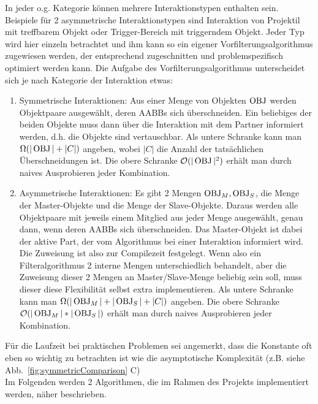 In jeder o.g. Kategorie können mehrere Interaktionstypen enthalten sein. Beispiele für 2 asymmetrische Interaktionstypen sind Interaktion von Projektil mit treffbarem Objekt oder Trigger-Bereich mit triggerndem Objekt. Jeder Typ wird hier einzeln betrachtet und ihm kann so ein eigener Vorfilterungsalgorithmus zugewiesen werden, der entsprechend zugeschnitten und problemspezifisch optimiert werden kann.
Die Aufgabe des Vorfilterungsalgorithmus unterscheidet sich je nach Kategorie der Interaktion etwas:
\begin{enumerate}
\item Symmetrische Interaktionen: Aus einer Menge von Objekten $\operatorname{OBJ}$ werden Objektpaare ausgewählt, deren AABBs sich überschneiden. Ein beliebiges der beiden Objekte muss dann über die Interaktion mit dem Partner informiert werden, d.h. die Objekte sind vertauschbar.
Als untere Schranke kann man $\Omega (|\operatorname{OBJ}|+|C|)$ angeben, wobei $|C|$ die Anzahl der tatsächlichen Überschneidungen ist. Die obere Schranke $\mathcal{O}(|\operatorname{OBJ}|^2)$ erhält man durch naives Ausprobieren jeder Kombination.
\item Asymmetrische Interaktionen: Es gibt 2 Mengen $\operatorname{OBJ}_M, \operatorname{OBJ}_S$, die Menge der Master-Objekte und die Menge der Slave-Objekte. Daraus werden alle Objektpaare mit jeweils einem Mitglied aus jeder Menge ausgewählt, genau dann, wenn deren AABBs sich überschneiden. Das Master-Objekt ist dabei der aktive Part, der vom Algorithmus bei einer Interaktion informiert wird. Die Zuweisung ist also zur Compilezeit festgelegt. Wenn also ein Filteralgorithmus 2 interne Mengen unterschiedlich behandelt, aber die Zuweisung dieser 2 Mengen an Master/Slave-Menge beliebig sein soll, muss dieser diese Flexibilität selbst extra implementieren. Als untere Schranke kann man $\Omega(|\operatorname{OBJ}_M|+|\operatorname{OBJ}_S|+|C|)$ angeben. Die obere Schranke $\mathcal{O}(|\operatorname{OBJ}_M|*|\operatorname{OBJ}_S|)$ erhält man durch naives Ausprobieren jeder Kombination.
\end{enumerate}

Für die Laufzeit bei praktischen Problemen sei angemerkt, dass die Konstante oft eben so wichtig zu betrachten ist wie die asymptotische Komplexität (z.B. siehe Abb.~\ref{fig:symmetricComparison} C)\\
Im Folgenden werden 2 Algorithmen, die im Rahmen des Projekts implementiert werden, näher beschrieben.


